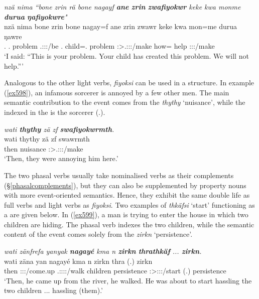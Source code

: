\begin{exe}
	\ex \emph{nzä nima ``bone zrin rä bone nagayf \textbf{ane} \textbf{zrin} \textbf{zwafiyokwr} keke kwa monme \textbf{durua} \textbf{ŋafiyokwre}"}\\
	\gll nzä nima bone zrin  bone nagay=f ane zrin zwawr keke kwa mon=me durua ŋawre\\
	\Fsg.{\Abs} {\Quot} \Ssg.{\Poss} problem \Tsg.\F:\Sbj:\Nonpast:\Ipfv/be \Ssg.{\Poss} child=\Erg.{\Sg} {\Dem} problem \Stsg:\Sbj>\Tsg.\F:\Obj:\Rpst:\Ipfv/make {\Neg} {\Fut} how={\Ins} help \Fpl:\Sbj:\Nonpast:\Ipfv/make\\
	\trans `I said: ``This is your problem. Your child has created this problem. We will not help.'''
	\label{ex597}
\end{exe}

Analogous to the other light verbs, \emph{fiyoksi} can be used in a  structure. In example (\ref{ex598}), an infamous sorcerer is annoyed by a few other men. The main semantic contribution to the event comes from the  \emph{thythy} `nuisance', while the  indexed in the  is the sorcerer (\Tsg.\Masc).

\begin{exe}
	\ex \emph{wati \textbf{thythy} zä zf \textbf{swafiyokwrmth}.}\\
	\gll wati thythy zä zf swawrmth\\
	then nuisance {\Prox} {\Imm} \Stpl:\Sbj>\Tsg.\Masc:\Obj:\Pst:\Dur/make\\
	\trans `Then, they were annoying him here.'
	\label{ex598}
\end{exe}

The two phasal verbs usually take nominalised verbs as their complements ({\S}\ref{phasalcomplements}), but they can also be supplemented by property nouns with more event-oriented semantics. Hence, they exhibit the same double life as full verbs and light verbs as \emph{fiyoksi}. Two examples of \emph{thkäfsi} `start' functioning as a  are given below. In (\ref{ex599}), a man is trying to enter the house in which two children are hiding. The phasal verb indexes the two children, while the semantic content of the event comes solely from the  \emph{zirkn} `persistence'.

\begin{exe}
	\ex \emph{wati zänfrefa yanyak \textbf{nagayé} kma n \textbf{zirkn} \textbf{thrathkäf} ... \textbf{zirkn}.}\\
	\gll wati zäna yan nagayé kma n zirkn thra (.) zirkn\\
	then \Sg:\Sbj:\Pst:\Pfv/come.up \Tsg.\Masc:\Sbj:\Nonpast:\Ipfv:\Venit/walk children {\Pot} {\Imn} persistence \Stsg:\Sbj>\Stdu:\Obj:\Irr:\Pfv/start (.) persistence\\
	\trans `Then, he came up from the river, he walked. He was about to start hassling the two children ... hassling (them).'
	\label{ex599}
\end{exe}

